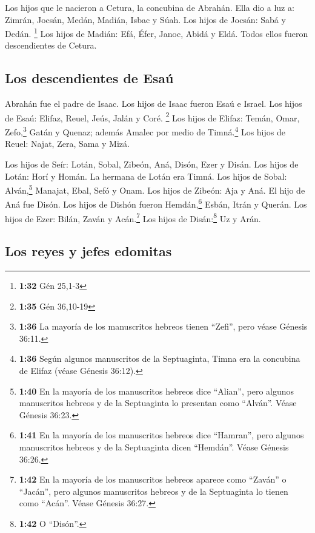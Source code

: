  Los hijos que le nacieron a Cetura, la concubina de
Abrahán. Ella dio a luz a: Zimrán, Jocsán, Medán, Madián, Isbac y Súah.
Los hijos de Jocsán: Sabá y Dedán. \footnote{\textbf{1:32} Gén 25,1-3}
 Los hijos de Madián: Efá, Éfer, Janoc, Abidá y Eldá.
Todos ellos fueron descendientes de Cetura.

\hypertarget{los-descendientes-de-esauxfa}{%
\subsection{Los descendientes de
Esaú}\label{los-descendientes-de-esauxfa}}

 Abrahán fue el padre de Isaac. Los hijos de Isaac fueron
Esaú e Israel.  Los hijos de Esaú: Elifaz, Reuel, Jeús,
Jalán y Coré. \footnote{\textbf{1:35} Gén 36,10-19}  Los
hijos de Elifaz: Temán, Omar, Zefo,\footnote{\textbf{1:36} La mayoría de
  los manuscritos hebreos tienen ``Zefi'', pero véase Génesis 36:11.}
Gatán y Quenaz; además Amalec por medio de Timná.\footnote{\textbf{1:36}
  Según algunos manuscritos de la Septuaginta, Timna era la concubina de
  Elifaz (véase Génesis 36:12).}  Los hijos de Reuel:
Najat, Zera, Sama y Mizá.

 Los hijos de Seír: Lotán, Sobal, Zibeón, Aná, Disón,
Ezer y Disán.  Los hijos de Lotán: Horí y Homán. La
hermana de Lotán era Timná.  Los hijos de Sobal:
Alván,\footnote{\textbf{1:40} En la mayoría de los manuscritos hebreos
  dice ``Alian'', pero algunos manuscritos hebreos y de la Septuaginta
  lo presentan como ``Alván''. Véase Génesis 36:23.} Manajat, Ebal, Sefó
y Onam. Los hijos de Zibeón: Aja y Aná.  El hijo de Aná
fue Disón. Los hijos de Dishón fueron Hemdán,\footnote{\textbf{1:41} En
  la mayoría de los manuscritos hebreos dice ``Hamran'', pero algunos
  manuscritos hebreos y de la Septuaginta dicen ``Hemdán''. Véase
  Génesis 36:26.} Esbán, Itrán y Querán.  Los hijos de
Ezer: Bilán, Zaván y Acán.\footnote{\textbf{1:42} En la mayoría de los
  manuscritos hebreos aparece como ``Zaván'' o ``Jacán'', pero algunos
  manuscritos hebreos y de la Septuaginta lo tienen como ``Acán''. Véase
  Génesis 36:27.} Los hijos de Disán:\footnote{\textbf{1:42} O
  ``Disón''.} Uz y Arán.

\hypertarget{los-reyes-y-jefes-edomitas}{%
\subsection{Los reyes y jefes
edomitas}\label{los-reyes-y-jefes-edomitas}}

